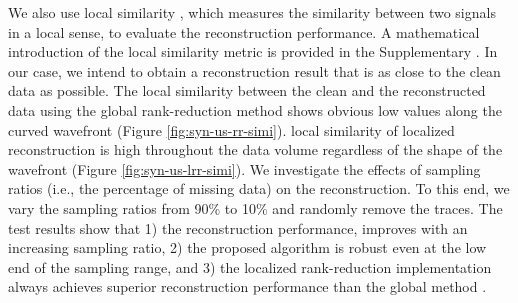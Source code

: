We also use local similarity \cite[]{fomel2007localattr}, which measures the similarity between two signals in a local sense, to evaluate the reconstruction performance. A mathematical introduction of the local similarity metric is provided in the Supplementary . In our case, we intend to obtain a reconstruction result that is as close to the clean data as possible.  The local similarity between the clean and the reconstructed data using the global rank-reduction method shows obvious low values along the curved wavefront (Figure \ref{fig:syn-us-rr-simi}).  local similarity of localized reconstruction is high throughout the data volume regardless of the shape of the wavefront (Figure \ref{fig:syn-us-lrr-simi}). We  investigate the effects of sampling ratios (i.e., the percentage of missing data) on the reconstruction.  To this end, we vary the sampling ratios from 90\% to 10\% and randomly remove the traces. The test results show that 1) the reconstruction performance,  improves with an increasing sampling ratio, 2) the proposed algorithm is robust even at the low end  of the sampling range, and 3) the localized rank-reduction implementation always achieves superior reconstruction performance than the global method .

